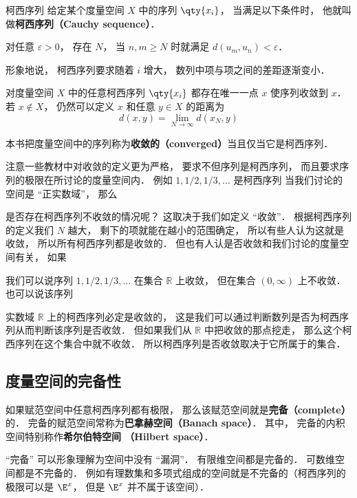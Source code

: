 

\begin{definition}{柯西序列}
给定某个度量空间 $X$ 中的序列 $\qty{x_i}$， 当满足以下条件时， 他就叫做\textbf{柯西序列（Cauchy sequence）}．

对任意 $\varepsilon > 0$， 存在 $N$， 当 $n, m \geqslant N$ 时就满足 $d(u_m, u_n) < \varepsilon$．
\end{definition}

形象地说， 柯西序列要求随着 $i$ 增大， 数列中项与项之间的差距逐渐变小．

\begin{theorem}{}
对度量空间 $X$ 中的任意柯西序列 $\qty{x_i}$ 都存在唯一一点 $x$ 使序列收敛到 $x$． 若 $x \notin X$， 仍然可以定义 $x$ 和任意 $y\in X$ 的距离为
\begin{equation}
d(x, y) = \lim_{N\to\infty} d(x_N, y)
\end{equation}
\end{theorem}

\begin{definition}{}\label{cauchy_def1}
本书把度量空间中的序列称为\textbf{收敛的（converged）}当且仅当它是柯西序列．
\end{definition}
注意一些教材中对收敛的定义更为严格， 要求不但序列是柯西序列， 而且要求序列的极限在所讨论的度量空间内． 例如 $1, 1/2, 1/3, \dots$ 是柯西序列    当我们讨论的空间是 “正实数域”， 那么



是否存在柯西序列不收敛的情况呢？ 这取决于我们如定义 “收敛”． 根据柯西序列的定义我们 $N$ 越大， 剩下的项就能在越小的范围确定， 所以有些人认为这就是收敛， 所以所有柯西序列都是收敛的． 但也有人认是否收敛和我们讨论的度量空间有关， 如果
\begin{example}{}
我们可以说序列 $1, 1/2, 1/3, \dots$ 在集合 $\mathbb R$ 上收敛， 但在集合 $(0, \infty)$ 上不收敛． 也可以说该序列
\end{example}

实数域 $\mathbb R$ 上的柯西序列必定是收敛的， 这是我们可以通过判断数列是否为柯西序列从而判断该序列是否收敛． 但如果我们从 $\mathbb R$ 中把收敛的那点挖走， 那么这个柯西序列在这个集合中就不收敛． 所以柯西序列是否收敛取决于它所属于的集合． %

\subsection{度量空间的完备性}
如果赋范空间中任意柯西序列都有极限， 那么该赋范空间就是\textbf{完备（complete）}的． 完备的赋范空间常称为\textbf{巴拿赫空间（Banach space）}． 其中， 完备的内积空间特别称作\textbf{希尔伯特空间 （Hilbert space）}．

“完备” 可以形象理解为空间中没有 “漏洞”． 有限维空间都是完备的． 可数维空间都是不完备的． 例如有理数集和多项式组成的空间就是不完备的（柯西序列的极限可以是 $\E^x$， 但是 $\E^x$ 并不属于该空间）．
